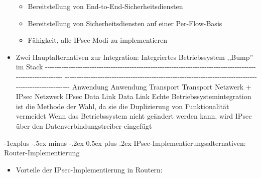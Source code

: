 \documentclass[a4paper]{article}
\makeatletter
\renewcommand{\subsection}{\@startsection{subsection}{2}{0mm}%
 {-1explus -.5ex minus -.2ex}%
 {0.5ex plus .2ex}%
 {\normalfont\normalsize\bfseries}}
\makeatother
\begin{document}
\begin{multicols}{3}
\begin{itemize}
              \begin{itemize}
                  \item
                        Bereitstellung von End-to-End-Sicherheitsdiensten
                  \item
                        Bereitstellung von Sicherheitsdiensten auf einer Per-Flow-Basis
                  \item
                        Fähigkeit, alle IPsec-Modi zu implementieren
              \end{itemize}
        \item
              Zwei Hauptalternativen zur Integration: \textbar{} Integriertes
              Betriebssystem \textbar{} ,,Bump'' im Stack \textbar{} \textbar{}
              -\/-\/-\/-\/-\/-\/-\/-\/-\/-\/-\/-\/-\/-\/-\/-\/-\/-\/-\/-\/-\/-\/-\/-\/-\/-\/-\/-\/-\/-\/-\/-\/-\/-\/-\/-\/-\/-\/-\/-\/-\/-\/-\/-\/-\/-\/-\/-\/-\/-\/-\/-\/-\/-\/-\/-\/-\/-\/-\/-\/-\/-\/-\/-\/-\/-\/-\/-\/-\/-\/-\/-\/-\/-\/-\/-\/-\/-\/-\/-\/-\/-\/-\/-\/-\/-\/-\/-\/-\/-\/-\/-\/-\/-\/-\/-\/-\/-\/-\/-\/-\/-\/-\/-\/-\/-\/-\/-\/-\/-
              \textbar{}
              -\/-\/-\/-\/-\/-\/-\/-\/-\/-\/-\/-\/-\/-\/-\/-\/-\/-\/-\/-\/-\/-\/-\/-\/-\/-\/-\/-\/-\/-\/-\/-\/-\/-\/-\/-\/-\/-\/-\/-\/-\/-\/-\/-\/-\/-\/-\/-\/-\/-\/-\/-\/-\/-\/-\/-\/-\/-\/-\/-\/-\/-\/-\/-\/-\/-\/-\/-\/-\/-\/-\/-\/-\/-\/-\/-\/-\/-\/-\/-\/-\/-\/-\/-\/-\/-\/-\/-\/-\/-\/-\/-\/-\/-\/-\/-\/-\/-\/-\/-\/-\/-\/-\/-\/-
              \textbar{} \textbar{} Anwendung \textbar{} Anwendung \textbar{}
              \textbar{} Transport \textbar{} Transport \textbar{} \textbar{}
              Netzwerk + IPsec \textbar{} Netzwerk \textbar{} \textbar{} IPsec
              \textbar{} \textbar{} Data Link \textbar{} Data Link \textbar{}
              \textbar{} \textbar{} \textbar{} Echte Betriebssystemintegration ist
              die Methode der Wahl, da sie die Duplizierung von Funktionalität
              vermeidet \textbar{} Wenn das Betriebssystem nicht geändert werden
              kann, wird IPsec über den Datenverbindungstreiber eingefügt \textbar{}
    \end{itemize}


    \subsection{IPsec-Implementierungsalternativen:
        Router-Implementierung}

    \begin{itemize}
        \item
              Vorteile der IPsec-Implementierung in Routern:


\end{itemize}
\end{multicols}
\end{document}
